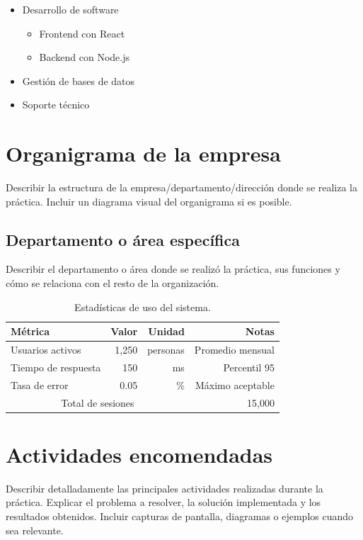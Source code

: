 \documentclass[12pt, a4paper]{article}
\begin{document}
\begin{itemize}
    \item Desarrollo de software
    \begin{itemize}
        \item Frontend con React
        \item Backend con Node.js
    \end{itemize}
    \item Gestión de bases de datos
    \item Soporte técnico
\end{itemize}

\section{Organigrama de la empresa}
Describir la estructura de la empresa/departamento/dirección donde se realiza la práctica. Incluir un diagrama visual del organigrama si es posible.

\subsection{Departamento o área específica}
Describir el departamento o área donde se realizó la práctica, sus funciones y cómo se relaciona con el resto de la organización.

\begin{table}[h]
    \centering
    \caption{Estadísticas de uso del sistema.}
    \label{tab:stats}
    \begin{tabular}{|l|r|r|r|}
        \hline
        \textbf{Métrica} & \textbf{Valor} & \textbf{Unidad} & \textbf{Notas} \\
        \hline
        Usuarios activos & 1,250 & personas & Promedio mensual \\
        \hline
        Tiempo de respuesta & 150 & ms & Percentil 95 \\
        \hline
        Tasa de error & 0.05 & \% & Máximo aceptable \\
        \hline
        \multicolumn{3}{|c|}{Total de sesiones} & 15,000 \\
        \hline
    \end{tabular}
\end{table}

\section{Actividades encomendadas}
Describir detalladamente las principales actividades realizadas durante la práctica. Explicar el problema a resolver, la solución implementada y los resultados obtenidos. Incluir capturas de pantalla, diagramas o ejemplos cuando sea relevante.
\end{document}
